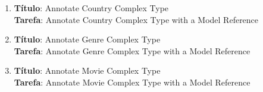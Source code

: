 \begin{tcolorbox}
\begin{enumerate}[label=(T\arabic*)]
		
        \item 
        \textbf{Título}: Annotate Country Complex Type
        \\
        \textbf{Tarefa}: Annotate Country Complex Type with a Model Reference
        
		
        \item 
        \textbf{Título}: Annotate Genre Complex Type
        \\
        \textbf{Tarefa}: Annotate Genre Complex Type with a Model Reference
        
		
        \item 
        \textbf{Título}: Annotate Movie Complex Type
        \\
        \textbf{Tarefa}: Annotate Movie Complex Type with a Model Reference
        
        
    \setlength{\parskip}{0.2cm}
    
    \end{enumerate}
\end{tcolorbox}




